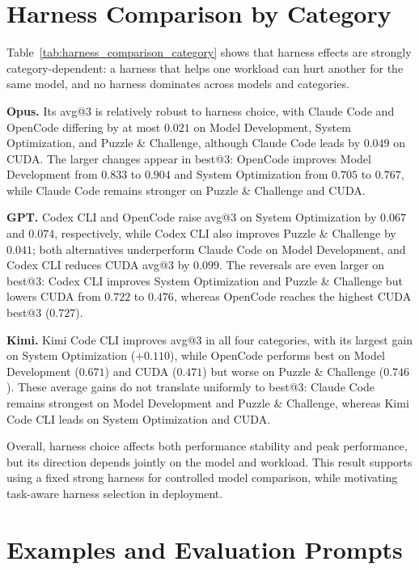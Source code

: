 \section{Harness Comparison by Category}
\label{app:harness_by_category}



Table~\ref{tab:harness_comparison_category} shows that harness effects are strongly category-dependent: a harness that helps one workload can hurt another for the same model, and no harness dominates across models and categories.

\textbf{Opus.}
Its avg@3 is relatively robust to harness choice, with Claude Code and OpenCode differing by at most $0.021$ on Model Development, System Optimization, and Puzzle \& Challenge, although Claude Code leads by $0.049$ on CUDA.
The larger changes appear in best@3: OpenCode improves Model Development from $0.833$ to $0.904$ and System Optimization from $0.705$ to $0.767$, while Claude Code remains stronger on Puzzle \& Challenge and CUDA.

\textbf{GPT.}
Codex CLI and OpenCode raise avg@3 on System Optimization by $0.067$ and $0.074$, respectively, while Codex CLI also improves Puzzle \& Challenge by $0.041$; both alternatives underperform Claude Code on Model Development, and Codex CLI reduces CUDA avg@3 by $0.099$.
The reversals are even larger on best@3: Codex CLI improves System Optimization and Puzzle \& Challenge but lowers CUDA from $0.722$ to $0.476$, whereas OpenCode reaches the highest CUDA best@3 ($0.727$).

\textbf{Kimi.}
Kimi Code CLI improves avg@3 in all four categories, with its largest gain on System Optimization ($+0.110$), while OpenCode performs best on Model Development ($0.671$) and CUDA ($0.471$) but worse on Puzzle \& Challenge ($0.746$).
These average gains do not translate uniformly to best@3: Claude Code remains strongest on Model Development and Puzzle \& Challenge, whereas Kimi Code CLI leads on System Optimization and CUDA.

Overall, harness choice affects both performance stability and peak performance, but its direction depends jointly on the model and workload.
This result supports using a fixed strong harness for controlled model comparison, while motivating task-aware harness selection in deployment.






\section{Examples and Evaluation Prompts}
\label{app:text_artifacts}

